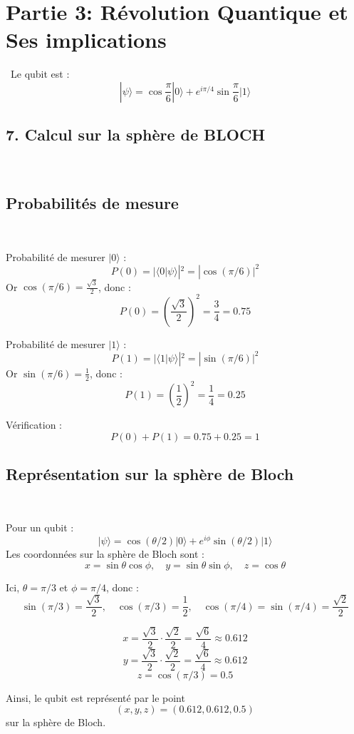 \documentclass[12pt,a4paper]{report}
\begin{document}
	\vfill
	\newpage
	\thispagestyle{plain}
	
	{\Large
		\section*{Partie 3: Révolution Quantique et Ses implications}\
		Le qubit est :
		\[
		|\psi\rangle = \cos\frac{\pi}{6}|0\rangle + e^{i\pi/4}\sin\frac{\pi}{6}|1\rangle
		\]
		\subsection*{7. Calcul sur la sphère de BLOCH}\
		\subsection*{Probabilités de mesure}\
		
		{Probabilité de mesurer } $|0\rangle$ :
		\[
		P(0) = |\langle 0|\psi\rangle|^2 = |\cos(\pi/6)|^2
		\]
		Or $\cos(\pi/6) = \frac{\sqrt{3}}{2}$, donc :
		\[
		P(0) = \left(\frac{\sqrt{3}}{2}\right)^2 = \frac{3}{4} = 0.75
		\]
		
		{Probabilité de mesurer } $|1\rangle$ :
		\[
		P(1) = |\langle 1|\psi\rangle|^2 = |\sin(\pi/6)|^2
		\]
		Or $\sin(\pi/6) = \frac{1}{2}$, donc :
		\[
		P(1) = \left(\frac{1}{2}\right)^2 = \frac{1}{4} = 0.25
		\]
		
		Vérification : 
		\[
		P(0) + P(1) = 0.75 + 0.25 = 1
		\]
		
		\subsection*{Représentation sur la sphère de Bloch}\
		
		Pour un qubit :
		\[
		|\psi\rangle = \cos(\theta/2)|0\rangle + e^{i\phi}\sin(\theta/2)|1\rangle
		\]
		Les coordonnées sur la sphère de Bloch sont :
		\[
		x = \sin\theta \cos\phi, \quad y = \sin\theta \sin\phi, \quad z = \cos\theta
		\]
		
		Ici, $\theta = \pi/3$ et $\phi = \pi/4$, donc :
		\[
		\sin(\pi/3) = \frac{\sqrt{3}}{2}, \quad \cos(\pi/3) = \frac{1}{2}, \quad \cos(\pi/4) = \sin(\pi/4) = \frac{\sqrt{2}}{2}
		\]
		
		\[
		x = \frac{\sqrt{3}}{2} \cdot \frac{\sqrt{2}}{2} = \frac{\sqrt{6}}{4} \approx 0.612
		\]
		\[
		y = \frac{\sqrt{3}}{2} \cdot \frac{\sqrt{2}}{2} = \frac{\sqrt{6}}{4} \approx 0.612
		\]
		\[
		z = \cos(\pi/3) = 0.5
		\]
		
		Ainsi, le qubit est représenté par le point 
		\[
		(x, y, z) = (0.612, 0.612, 0.5)
		\]
		sur la sphère de Bloch.
		
}
\end{document}
